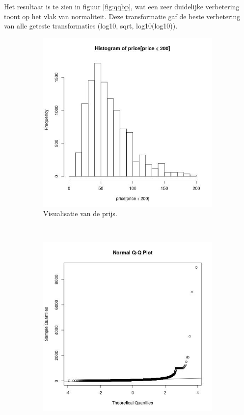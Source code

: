 \documentclass[a4paper,kulak]{kulakarticle} %
\begin{document}
Het resultaat is te zien in figuur \ref{fig:qqbp}, wat een zeer duidelijke verbetering toont op het vlak van normaliteit.
Deze transformatie gaf de beste verbetering van alle geteste transformaties (log10, sqrt, log10(log10)).
\begin{figure}[H]
	\centering
	\begin{subfigure}[b]{0.45\textwidth}
		\includegraphics[width=\textwidth]{prijsVis.jpg}
		\caption{Visualisatie van de prijs.}
		\label{fig:pv}
	\end{subfigure}
	~ %
	\begin{subfigure}[b]{0.45\textwidth}
		\includegraphics[width=\textwidth]{qqp.jpg}

\end{subfigure}
\end{figure}
\end{document}
